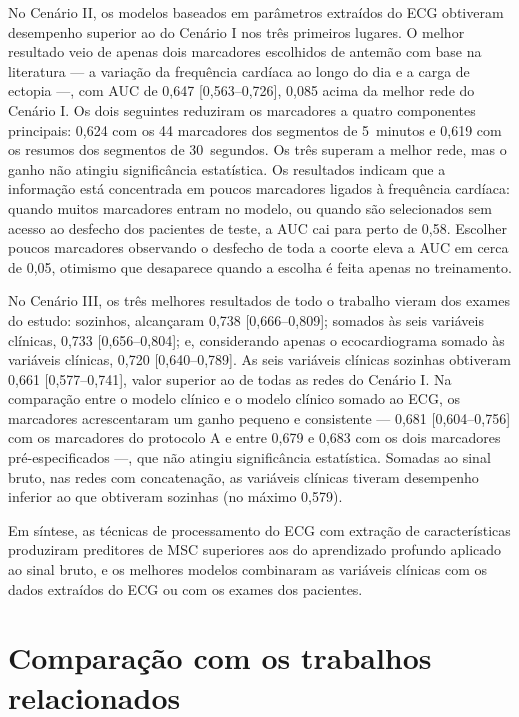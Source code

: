 No Cenário II, os modelos baseados em parâmetros extraídos do \gls{ECG}
obtiveram desempenho superior ao do Cenário I nos três primeiros lugares. O
melhor resultado veio de apenas dois marcadores escolhidos de antemão com
base na literatura --- a variação da frequência cardíaca ao longo do dia e a
carga de ectopia ---, com \gls{AUC} de 0,647 [0,563--0,726], 0,085 acima da
melhor rede do Cenário I. Os dois seguintes reduziram os marcadores a
quatro componentes principais: 0,624 com os 44 marcadores dos segmentos de
5~minutos e 0,619 com os resumos dos segmentos de 30~segundos. Os três
superam a melhor rede, mas o ganho não atingiu significância estatística.
Os resultados indicam que a informação está concentrada em poucos
marcadores ligados à frequência cardíaca: quando muitos marcadores entram
no modelo, ou quando são selecionados sem acesso ao desfecho dos pacientes
de teste, a \gls{AUC} cai para perto de 0,58. Escolher poucos marcadores
observando o desfecho de toda a coorte eleva a \gls{AUC} em cerca de 0,05,
otimismo que desaparece quando a escolha é feita apenas no treinamento.

No Cenário III, os três melhores resultados de todo o trabalho vieram dos
exames do estudo: sozinhos, alcançaram 0,738 [0,666--0,809]; somados às
seis variáveis clínicas, 0,733 [0,656--0,804]; e, considerando apenas o
ecocardiograma somado às variáveis clínicas, 0,720 [0,640--0,789]. As seis
variáveis clínicas sozinhas obtiveram 0,661 [0,577--0,741], valor superior
ao de todas as redes do Cenário I. Na comparação entre o modelo clínico e o
modelo clínico somado ao \gls{ECG}, os marcadores acrescentaram um ganho
pequeno e consistente --- 0,681 [0,604--0,756] com os marcadores do
protocolo A e entre 0,679 e 0,683 com os dois marcadores pré-especificados
---, que não atingiu significância estatística. Somadas ao sinal bruto, nas
redes com concatenação, as variáveis clínicas tiveram desempenho inferior
ao que obtiveram sozinhas (no máximo 0,579).

Em síntese, as técnicas de processamento do \gls{ECG} com extração de
características produziram preditores de \gls{MSC} superiores aos do
aprendizado profundo aplicado ao sinal bruto, e os melhores modelos
combinaram as variáveis clínicas com os dados extraídos do \gls{ECG} ou com
os exames dos pacientes.

\section{Comparação com os trabalhos relacionados}
\label{sec:conc-comparacao}


